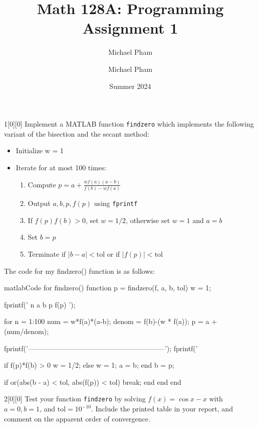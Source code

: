 \documentclass{article}
\title{#1}
\author{Michael Pham}
\date{#2}
\renewcommand{\mytitle}[2]{%
	\title{#1}
	\author{Michael Pham}
	\date{#2}
	\maketitle
	\newpage
	\listoftheorems
	\newpage
}
\begin{document}
\mytitle{Math 128A: Programming Assignment 1}{Summer 2024}
\setcounter{section}{1}
\begin{hw}{1}[0][0]
	Implement a MATLAB function \texttt{findzero} which implements the following variant of the bisection and the secant method:
	\begin{itemize}
		\item Initialize w = 1
		\item Iterate for at most 100 times:
		\begin{enumerate}
			\item Compute $p = a + \frac{wf (a)(a - b)}{f (b) - wf (a)}$
			\item Output $a, b, p, f (p)$ using \texttt{fprintf}
			\item If $f (p)f (b) > 0$, set $w = 1/2$, otherwise set $w = 1$ and $a = b$
			\item Set $b = p$
			\item Terminate if $\lvert b - a\rvert < \mathrm{tol}$ or if $\lvert f(p) \rvert < \mathrm{tol}$
		\end{enumerate}
	\end{itemize}
\end{hw}
\begin{solution}
The code for my findzero() function is as follows:
\begin{code}{matlab}{Code for findzero()}
function p = findzero(f, a, b, tol)
w = 1;

fprintf(' n         a             b             p           f(p)    \n');

for n = 1:100
	num = w*f(a)*(a-b);
	denom = f(b)-(w * f(a));
	p = a + (num/denom);
	
	fprintf('-----------------------------------------------------------\n');
	fprintf('%
	
	if f(p)*f(b) > 0
		w = 1/2;
	else
		w = 1;
		a = b;
	end
	b = p;
	
	if or(abs(b - a) < tol, abs(f(p)) < tol)
		break;
	end
end
end
\end{code}
\end{solution}

\begin{hw}{2}[0][0]
	Test your function \texttt{findzero} by solving $f (x) = \cos x - x$ with $a = 0, b = 1$, and $\mathrm{tol} = 10^{-10}$.
	Include the printed table in your report, and comment on the apparent order of convergence.
\end{hw}
\end{document}
